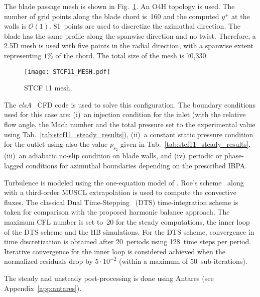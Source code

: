 
The blade passage mesh is shown in Fig.~\ref{fig:stcf11_mesh}.
An O4H topology is used.
The number of grid points along the blade
chord is~160 and the computed $y^+$ at the walls is $\mathcal{O}(1)$.
81~points are used to discretize the azimuthal direction.
The blade has the same profile along the spanwise direction and no
twist. Therefore, a 2.5D mesh is used with five points 
in the radial direction, with a spanwise
extent representing $1\%$ of the chord. 
The total size of the mesh is 70,330.
\begin{figure}[htp]
  \centering
  \texttt{[image: STCF11\_MESH.pdf]}
  \caption{STCF 11 mesh.}
  \label{fig:stcf11_mesh}
\end{figure}

The \textit{elsA}~\cite{Cambier2013} CFD code is used 
to solve this configuration.
The boundary conditions used for this case are: (i)~an
injection condition  for the inlet (with the relative flow angle,
the Mach number and the total pressure
set to the experimental value using Tab.~\ref{tab:stcf11_steady_results}), 
(ii)~a constant static pressure
condition for the outlet using also the value $p_{s_2}$
given in Tab.~\ref{tab:stcf11_steady_results},  
(iii)~an adiabatic no-slip condition on
blade walls, and (iv)~periodic or phase-lagged conditions 
for azimuthal boundaries depending on the  
prescribed IBPA.

Turbulence is modeled using the one-equation model of
\citet{Spalart1992}.  Roe's scheme~\cite{Roe1981} along with a 
third-order MUSCL extrapolation 
is used to compute the convective fluxes.
The classical Dual Time-Stepping~\cite{Jameson1981} (DTS)
time-integration scheme is taken for comparison with the
proposed harmonic balance approach.
The maximum
CFL number is set to~20 for the steady computations,  the inner loop
of the DTS scheme and the HB simulations.  For the DTS scheme,  
convergence in time discretization is obtained
after 20~periods using 128~time steps per period.  Iterative convergence 
for the inner loop is considered achieved when the normalized
residuals drop by $5\cdot 10^{-2}$ (within a maximum of
50~sub-iterations).

The steady and unsteady post-processing is done using 
Antares (see Appendix~\ref{app:antares}).

